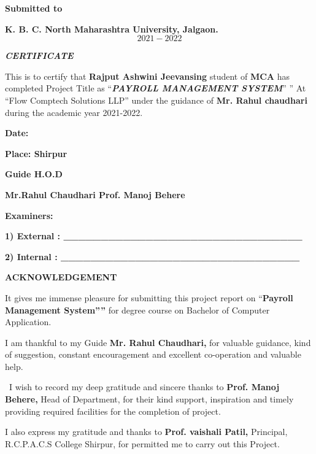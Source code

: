 \documentclass{article} %
\begin{document}
\noindent \textbf{Submitted to}

\noindent \textbf{K. B. C. North Maharashtra University, Jalgaon.}
\[2021-2022\] 
\textbf{}

\noindent \textbf{\textit{CERTIFICATE}}

\noindent  This is to certify that \textbf{Rajput Ashwini Jeevansing }student of \textbf{MCA} has completed Project Title as ``\textbf{\textit{PAYROLL MANAGEMENT SYSTEM}}'' \textbf{\textit{ }}'' At ``Flow Comptech Solutions LLP'' \textbf{ }under the guidance of \textbf{Mr. Rahul chaudhari} during the academic year 2021-2022.

\noindent \textbf{Date: }

\noindent \textbf{Place: Shirpur}

\noindent \textbf{}

\noindent \textbf{}

\noindent \textbf{           Guide                    H.O.D}

\noindent \textbf{    Mr.Rahul Chaudhari                                             Prof. Manoj Behere}

\noindent \textbf{}

\noindent \textbf{Examiners:}

\noindent \textbf{ 1)    External  : \_\_\_\_\_\_\_\_\_\_\_\_\_\_\_\_\_\_\_\_\_\_\_\_\_\_\_\_\_\_\_\_}

\noindent \textbf{ 2)    Internal   : \_\_\_\_\_\_\_\_\_\_\_\_\_\_\_\_\_\_\_\_\_\_\_\_\_\_\_\_\_\_\_\_       }

\noindent \textbf{         ACKNOWLEDGEMENT}

\noindent \textbf{}

\noindent It gives me immense pleasure for submitting this project report on ``\textbf{Payroll Management System'''' }for degree course on Bachelor of Computer Application.

\noindent I am thankful to my Guide\textbf{ Mr. Rahul Chaudhari,} for valuable guidance, kind of suggestion, constant encouragement and excellent co-operation and valuable help.

\noindent ~I wish to record my deep gratitude and sincere thanks to \textbf{Prof. Manoj Behere,} Head of Department, for their kind support, inspiration and timely providing required facilities for the completion of project.~

\noindent I also express my gratitude and thanks to \textbf{Prof. vaishali Patil,} Principal, R.C.P.A.C.S College Shirpur, for permitted me to carry out this Project.
\end{document}
